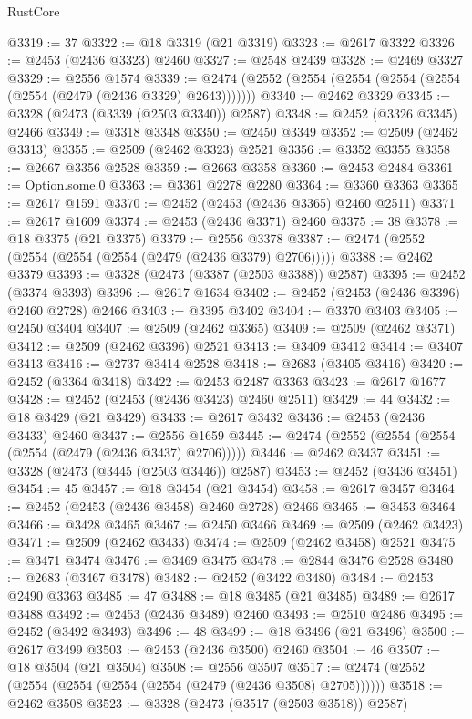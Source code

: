 \begin{lexlean}{RustCore}
\begin{coremodule}
@3319 := 37
@3322 := @18 @3319 (@21 @3319)
@3323 := @2617 @3322
@3326 := @2453 (@2436 @3323) @2460
@3327 := @2548 @2439
@3328 := @2469 @3327
@3329 := @2556 @1574
@3339 := @2474 (@2552 (@2554 (@2554 (@2554 (@2554 (@2554 (@2479 (@2436 @3329) @2643)))))))
@3340 := @2462 @3329
@3345 := @3328 (@2473 (@3339 (@2503 @3340)) @2587)
@3348 := @2452 (@3326 @3345) @2466
@3349 := @3318 @3348
@3350 := @2450 @3349
@3352 := @2509 (@2462 @3313)
@3355 := @2509 (@2462 @3323) @2521
@3356 := @3352 @3355
@3358 := @2667 @3356 @2528
@3359 := @2663 @3358
@3360 := @2453 @2484
@3361 := Option.some.{0}
@3363 := @3361 @2278 @2280
@3364 := @3360 @3363
@3365 := @2617 @1591
@3370 := @2452 (@2453 (@2436 @3365) @2460 @2511)
@3371 := @2617 @1609
@3374 := @2453 (@2436 @3371) @2460
@3375 := 38
@3378 := @18 @3375 (@21 @3375)
@3379 := @2556 @3378
@3387 := @2474 (@2552 (@2554 (@2554 (@2554 (@2479 (@2436 @3379) @2706)))))
@3388 := @2462 @3379
@3393 := @3328 (@2473 (@3387 (@2503 @3388)) @2587)
@3395 := @2452 (@3374 @3393)
@3396 := @2617 @1634
@3402 := @2452 (@2453 (@2436 @3396) @2460 @2728) @2466
@3403 := @3395 @3402
@3404 := @3370 @3403
@3405 := @2450 @3404
@3407 := @2509 (@2462 @3365)
@3409 := @2509 (@2462 @3371)
@3412 := @2509 (@2462 @3396) @2521
@3413 := @3409 @3412
@3414 := @3407 @3413
@3416 := @2737 @3414 @2528
@3418 := @2683 (@3405 @3416)
@3420 := @2452 (@3364 @3418)
@3422 := @2453 @2487 @3363
@3423 := @2617 @1677
@3428 := @2452 (@2453 (@2436 @3423) @2460 @2511)
@3429 := 44
@3432 := @18 @3429 (@21 @3429)
@3433 := @2617 @3432
@3436 := @2453 (@2436 @3433) @2460
@3437 := @2556 @1659
@3445 := @2474 (@2552 (@2554 (@2554 (@2554 (@2479 (@2436 @3437) @2706)))))
@3446 := @2462 @3437
@3451 := @3328 (@2473 (@3445 (@2503 @3446)) @2587)
@3453 := @2452 (@3436 @3451)
@3454 := 45
@3457 := @18 @3454 (@21 @3454)
@3458 := @2617 @3457
@3464 := @2452 (@2453 (@2436 @3458) @2460 @2728) @2466
@3465 := @3453 @3464
@3466 := @3428 @3465
@3467 := @2450 @3466
@3469 := @2509 (@2462 @3423)
@3471 := @2509 (@2462 @3433)
@3474 := @2509 (@2462 @3458) @2521
@3475 := @3471 @3474
@3476 := @3469 @3475
@3478 := @2844 @3476 @2528
@3480 := @2683 (@3467 @3478)
@3482 := @2452 (@3422 @3480)
@3484 := @2453 @2490 @3363
@3485 := 47
@3488 := @18 @3485 (@21 @3485)
@3489 := @2617 @3488
@3492 := @2453 (@2436 @3489) @2460
@3493 := @2510 @2486
@3495 := @2452 (@3492 @3493)
@3496 := 48
@3499 := @18 @3496 (@21 @3496)
@3500 := @2617 @3499
@3503 := @2453 (@2436 @3500) @2460
@3504 := 46
@3507 := @18 @3504 (@21 @3504)
@3508 := @2556 @3507
@3517 := @2474 (@2552 (@2554 (@2554 (@2554 (@2554 (@2479 (@2436 @3508) @2705))))))
@3518 := @2462 @3508
@3523 := @3328 (@2473 (@3517 (@2503 @3518)) @2587)

\end{coremodule}
\end{lexlean}
